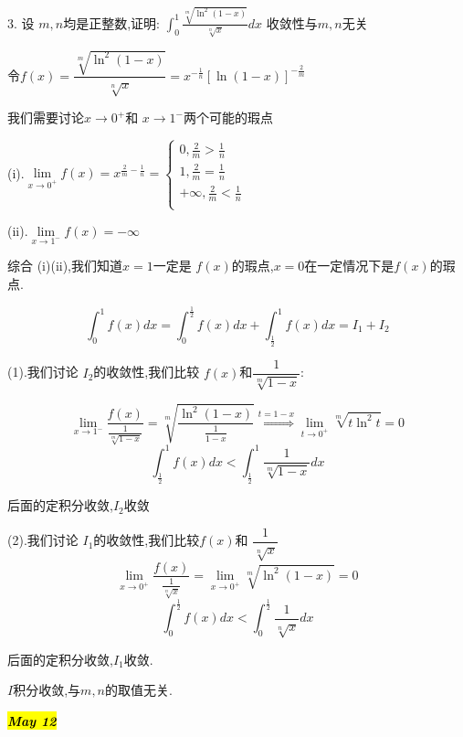
3. 设 $m,n$均是正整数,证明: $\int_{0}^{1}\frac{\sqrt[m]{\ln^{2}(1-x)}}{\sqrt[n]{x}}dx$ 收敛性与$m,n$无关
\begin{solution}
	
	令$f(x)=\dfrac{\sqrt[m]{\ln^{2}(1-x)}}{\sqrt[n]{x}}=x^{-\frac{1}{n}}[\ln(1-x)]^{-\frac{2}{m}}$
	
	我们需要讨论$x\rightarrow 0^{+}$和 $x\rightarrow 1^{-}$两个可能的瑕点
	
	(i).$\lim\limits_{x\rightarrow 0^{+}}f(x)=x^{\frac{2}{m}-\frac{1}{n}}=
	\left\lbrace
	\begin{array}{l}
		0,\frac{2}{m}>\frac{1}{n}\\
		1,\frac{2}{m}=\frac{1}{n}\\
		+\infty,\frac{2}{m}<\frac{1}{n}\\
	\end{array}
	\right. $
	
	(ii).$\lim\limits_{x\rightarrow 1^{-}}f(x)=-\infty$
	
	
	综合 (i)(ii),我们知道$x=1$一定是 $f(x)$的瑕点,$x=0$在一定情况下是$f(x)$的瑕点.
	
	$$\int_{0}^{1}f(x)dx=\int_{0}^{\frac{1}{2}}f(x)dx+\int_{\frac{1}{2}}^{1}f(x)dx=I_{1}+I_{2}$$
	
	(1).我们讨论 $I_{2}$的收敛性,我们比较 $f(x)$和$\dfrac{1}{\sqrt[m]{1-x}}$: 
	
	$$\lim\limits_{x\rightarrow 1^{-}}\frac{f(x)}{\frac{1}{\sqrt[m]{1-x}}}=\sqrt[m]{\frac{\ln^{2}(1-x)}{\frac{1}{1-x}}}\overset{t=1-x}{\Rightarrow}\lim\limits_{t\rightarrow 0^{+}}\sqrt[m]{t\ln^2 t}=0$$
	$$\int_{\frac{1}{2}}^{1}f(x)dx<\int_{\frac{1}{2}}^{1}\frac{1}{\sqrt[m]{1-x}}dx$$
	
	后面的定积分收敛,$I_{2}$收敛
	
	(2).我们讨论 $I_{1}$的收敛性,我们比较$f(x)$和 $\dfrac{1}{\sqrt[n]{x}}$
	$$\lim\limits_{x\rightarrow 0^{+}}\frac{f(x)}{\frac{1}{\sqrt[n]{x}}}=\lim\limits_{x\rightarrow 0^{+}}\sqrt[m]{\ln^{2}(1-x)}=0$$
	$$\int_{0}^{\frac{1}{2}}f(x)dx<\int_{0}^{\frac{1}{2}}\frac{1}{\sqrt[n]{x}}dx$$
	
	后面的定积分收敛,$I_{1}$收敛.
	
	$I$积分收敛,与$m,n$的取值无关.
	
\end{solution}


\hl{\textbf{\textit{May 12}}}

